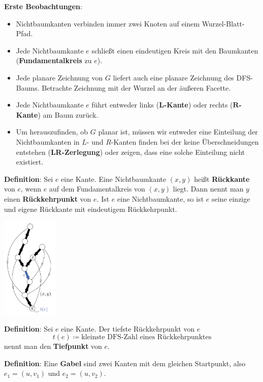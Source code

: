 \textbf{Erste Beobachtungen}:
\begin{itemize}
	\item Nichtbaumkanten verbinden immer zwei Knoten auf einem Wurzel-Blatt-Pfad.
	\item Jede Nichtbaumkante $e$ schließt einen eindeutigen Kreis mit den Baumkanten (\textbf{Fundamentalkreis} zu $e$).
	\item Jede planare Zeichnung von $G$ liefert auch eine planare Zeichnung des DFS-Baums. Betrachte Zeichnung mit der Wurzel an der äußeren Facette.
	\item Jede Nichtbaumkante $e$ führt entweder links (\textbf{$\mathbf{L}$-Kante}) oder rechts (\textbf{$\mathbf{R}$-Kante}) am Baum zurück.
	\item Um herauszufinden, ob $G$ planar ist, müssen wir entweder eine Einteilung der Nichtbaumkanten in $L$- und $R$-Kanten finden bei der keine Überschneidungen entstehen (\textbf{LR-Zerlegung}) oder zeigen, dass eine solche Einteilung nicht existiert.
\end{itemize}
\bigskip
\textbf{Definition}: Sei $e$ eine Kante. Eine Nichtbaumkante $(x, y)$ heißt \textbf{Rückkante} von $e$, wenn $e$ auf dem Fundamentalkreis von $(x, y)$ liegt. Dann nennt man $y$ einen \textbf{Rückkehrpunkt} von $e$. Ist $e$ eine Nichtbaumkante, so ist $e$ seine einzige und eigene Rückkante mit eindeutigem Rückkehrpunkt.
\begin{center}
	\includegraphics[width=0.2\textwidth]{images/back-edge.png}
\end{center}

\textbf{Definition}: Sei $e$ eine Kante. Der tiefste Rückkehrpunkt von $e$
$$t(e)\coloneqq \text{kleinste DFS-Zahl eines Rückkehrpunktes}$$ nennt man den \textbf{Tiefpunkt} von $e$.

\textbf{Definition}: Eine \textbf{Gabel} sind zwei Kanten mit dem gleichen Startpunkt, also $e_1=(u,v_1)$ und $e_2=(u,v_2)$.


